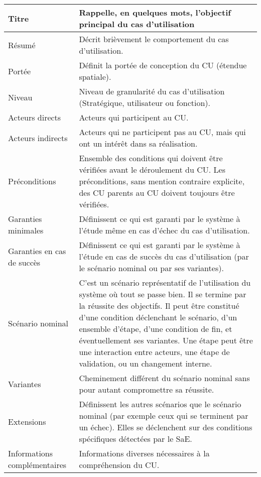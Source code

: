 \begin{xltabular}{\linewidth}{|l|X|}

    \hline
    Titre & Rappelle, en quelques mots, l’objectif principal du cas d’utilisation \\ \hline
    Résumé & Décrit brièvement le comportement du cas d’utilisation. \\ \hline
    Portée & Définit la portée de conception du CU (étendue spatiale). \\ \hline
    Niveau & Niveau de granularité du cas d’utilisation (Stratégique, utilisateur ou fonction). \\ \hline
    Acteurs directs & Acteurs qui participent au CU. \\ \hline
    Acteurs indirects & Acteurs qui ne participent pas au CU, mais qui ont un intérêt dans sa réalisation. \\ \hline
    Préconditions & Ensemble des conditions qui doivent être vérifiées avant le déroulement du CU. Les préconditions, sans mention contraire explicite, des CU parents au CU doivent
    toujours être vérifiées. \\ \hline
    Garanties minimales & Définissent ce qui est garanti par le système à l’étude même en cas d’échec du cas d’utilisation. \\ \hline
    Garanties en cas de succès & Définissent ce qui est garanti par le système à l'étude en cas de succès du cas d'utilisation (par le scénario nominal ou par ses variantes). \\ \hline

    Scénario nominal & C’est un scénario représentatif de l’utilisation du système où tout se passe bien. Il se termine par la réussite des objectifs. Il peut être constitué d’une condition déclenchant le scénario, d’un ensemble d’étape, d’une condition de fin, et éventuellement
    ses variantes. Une étape peut être une interaction entre acteurs, une
    étape de validation, ou un changement interne. \\ \hline

    Variantes & Cheminement différent du scénario nominal sans pour autant compromettre sa réussite. \\ \hline

    Extensions & Définissent les autres scénarios que le scénario nominal (par exemple ceux qui se
    terminent par un échec). Elles se déclenchent sur des conditions spécifiques détectées par le SaE. \\ \hline

    Informations complémentaires & Informations diverses nécessaires à la compréhension du CU. \\ \hline

\end{xltabular}